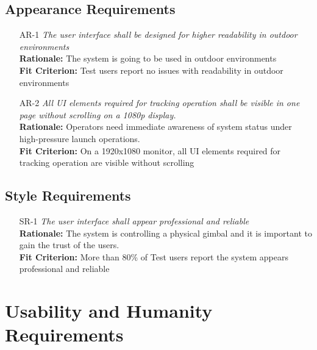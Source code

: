 \documentclass[12pt]{article}
\begin{document}
\subsection{Appearance Requirements}
\begin{itemize}[leftmargin=*]
  \item[AR-1] \emph{The user interface shall be designed for higher readability in
          outdoor environments}\\[2mm]
        \textbf{Rationale:} The system is going to be used in outdoor environments\\
        \textbf{Fit Criterion:} Test users report no issues with readability in outdoor environments

  \item[AR-2] \emph{All UI elements required for tracking operation shall be visible in
          one page without scrolling on a 1080p display.}\\[2mm]
        \textbf{Rationale:} Operators need immediate awareness of system
        status under high-pressure launch operations.\\
        \textbf{Fit Criterion:} On a 1920x1080 monitor, all UI elements required for tracking operation are visible without scrolling
\end{itemize}

\subsection{Style Requirements}
\begin{itemize}[leftmargin=*]
  \item[SR-1] \emph{The user interface shall appear professional and reliable}\\[2mm]
        \textbf{Rationale:} The system is controlling a physical gimbal and it is important to gain the trust of the users.\\
        \textbf{Fit Criterion:} More than 80\% of Test users report the system appears professional and reliable
\end{itemize}

\section{Usability and Humanity Requirements}
\end{document}
